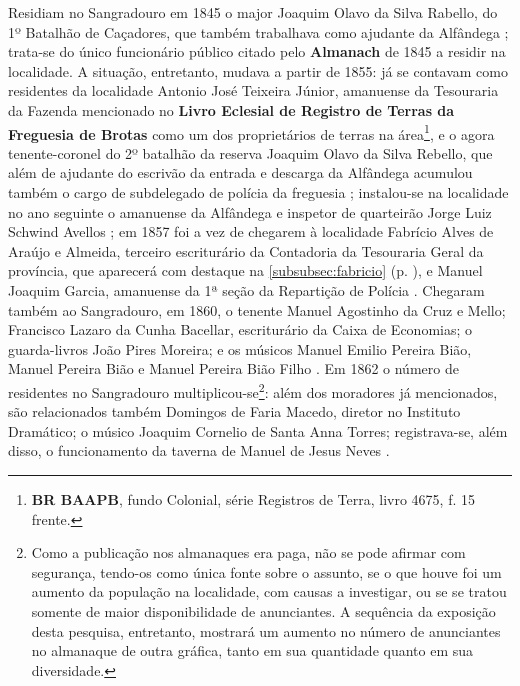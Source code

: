Residiam no Sangradouro em 1845 o major Joaquim Olavo da Silva Rabello, do 1º Batalhão de Caçadores, que também trabalhava como ajudante da Alfândega \cite[pp. 302, 367]{almanach_1845}; trata-se do único funcionário público citado pelo \textbf{Almanach} de 1845 a residir na localidade. A situação, entretanto, mudava a partir de 1855: já se contavam como residentes da localidade Antonio José Teixeira Júnior, amanuense da Tesouraria da Fazenda mencionado no \textbf{Livro Eclesial de Registro de Terras da Freguesia de Brotas} como um dos proprietários de terras na área\footnote{\textbf{BR BAAPB}, fundo Colonial, série Registros de Terra, livro 4675, f. 15 frente.}, e o agora tenente-coronel do 2º batalhão da reserva Joaquim Olavo da Silva Rebello, que além de ajudante do escrivão da entrada e descarga da Alfândega acumulou também o cargo de subdelegado de polícia da freguesia \cite[pp.~173, 176, 212]{masson_almanak_1855}; instalou-se na localidade no ano seguinte o amanuense da Alfândega e inspetor de quarteirão Jorge Luiz Schwind Avellos \cite[pp.~155, 248]{masson_almanak_1856}; em 1857 foi a vez de chegarem à localidade Fabrício Alves de Araújo e Almeida, terceiro escriturário da Contadoria da Tesouraria Geral da província, que aparecerá com destaque na \autoref{subsubsec:fabricio} (p. \pageref{subsubsec:fabricio}), e Manuel Joaquim Garcia, amanuense da 1ª seção da Repartição de Polícia \cite[p.~163, 242]{masson_almanak_1857}. Chegaram também ao Sangradouro, em 1860, o tenente Manuel Agostinho da Cruz e Mello; Francisco Lazaro da Cunha Bacellar, escriturário da Caixa de Economias; o guarda-livros João Pires Moreira; e os músicos Manuel Emilio Pereira Bião, Manuel Pereira Bião e Manuel Pereira Bião Filho  \cite[p.~222, 311, 344, 350]{masson_almanak_1860}. Em 1862 o número de residentes no Sangradouro multiplicou-se\footnote{Como a publicação nos almanaques era paga, não se pode afirmar com segurança, tendo-os como única fonte sobre o assunto, se o que houve foi um aumento da população na localidade, com causas a investigar, ou se se tratou somente de maior disponibilidade de anunciantes. A sequência da exposição desta pesquisa, entretanto, mostrará um aumento no número de anunciantes no almanaque de outra gráfica, tanto em sua quantidade quanto em sua diversidade.}: além dos moradores já mencionados, são relacionados também Domingos de Faria Macedo, diretor no Instituto Dramático; o músico Joaquim Cornelio de Santa Anna Torres; registrava-se, além disso, o funcionamento da taverna de Manuel de Jesus Neves \cite[p.~305, 324, 394]{masson_almanak_1862}.

